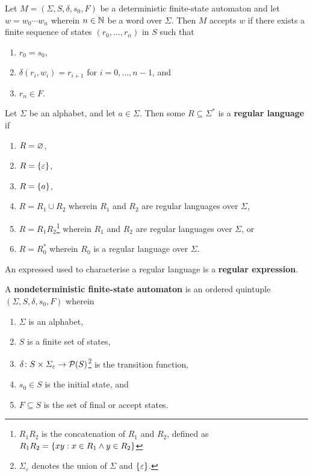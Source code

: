 Let \(M = (\varSigma, S, \delta, s_0, F)\) be a deterministic finite-state
automaton and let \(w = w_0 \cdots w_n\) wherein \(n \in \mathbb{N}\) be a word
over \(\varSigma\).  Then \(M\) accepts \(w\) if there exists a finite sequence
of states \((r_0, \ldots, r_n)\) in \(S\) such that
\begin{enumerate}
    \item \(r_0 = s_0\),
    \item \(\delta(r_i, w_i) = r_{i + 1}\) for \(i = 0, \ldots, n - 1\), and
    \item \(r_n \in F\).
\end{enumerate}

\Bdf
    Let \(\varSigma\) be an alphabet, and let \(a \in \varSigma\). Then some \(R
    \subseteq \varSigma^*\) is a {\bf regular language} if
    \begin{enumerate}
        \item \(R = \varnothing\),
        \item \(R = \{\varepsilon\}\),
        \item \(R = \{a\}\),
        \item \(R = R_1 \cup R_2\) wherein \(R_1\) and \(R_2\) are regular
        languages over \(\varSigma\),
        \item \(R = R_1 R_2\)\footnote{\(R_1 R_2\) is the concatenation of
        \(R_1\) and \(R_2\), defined as \(R_1 R_2 = \{x y : x \in R_1 \land y
        \in R_2\}\)} wherein \(R_1\) and \(R_2\) are regular languages over
        \(\varSigma\), or
        \item \(R = R_0^*\) wherein \(R_0\) is a regular language over
        \(\varSigma\).
    \end{enumerate}
\Edf

An expressed used to characterise a regular language is a {\bf regular
expression}.

\Bdf
    A {\bf nondeterministic finite-state automaton} is an ordered quintuple
    \((\varSigma, S, \delta, s_0, F)\) wherein
    \begin{enumerate}
        \item \(\varSigma\) is an alphabet,
        \item \(S\) is a finite set of states,
        \item \(\delta\colon S \times
        \varSigma_\varepsilon\to\mathcal{P}(S)\)\footnote{\(\varSigma_\varepsilon\)
        denotes the union of \(\varSigma\) and \(\{\varepsilon\}\).} is the
        transition function,
        \item \(s_0 \in S\) is the initial state, and
        \item \(F \subseteq S\) is the set of final or accept states.
    \end{enumerate}
\Edf

